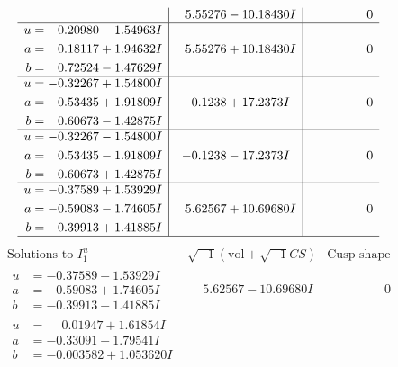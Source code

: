 \documentclass[1p]{elsarticle_modified}
\theoremstyle{definition}
\newcommand{\I}{\sqrt{-1}}
\begin{document}
$$\begin{array}{c|c|c}
 & \phantom{-}5.55276 - 10.18430 I & \phantom{-0.000000 } 0 \\ \hline\begin{aligned}
u &= \phantom{-}0.20980 - 1.54963 I \\
a &= \phantom{-}0.18117 + 1.94632 I \\
b &= \phantom{-}0.72524 - 1.47629 I\end{aligned}
 & \phantom{-}5.55276 + 10.18430 I & \phantom{-0.000000 } 0 \\ \hline\begin{aligned}
u &= -0.32267 + 1.54800 I \\
a &= \phantom{-}0.53435 + 1.91809 I \\
b &= \phantom{-}0.60673 - 1.42875 I\end{aligned}
 & -0.1238 + 17.2373 I & \phantom{-0.000000 } 0 \\ \hline\begin{aligned}
u &= -0.32267 - 1.54800 I \\
a &= \phantom{-}0.53435 - 1.91809 I \\
b &= \phantom{-}0.60673 + 1.42875 I\end{aligned}
 & -0.1238 - 17.2373 I & \phantom{-0.000000 } 0 \\ \hline\begin{aligned}
u &= -0.37589 + 1.53929 I \\
a &= -0.59083 - 1.74605 I \\
b &= -0.39913 + 1.41885 I\end{aligned}
 & \phantom{-}5.62567 + 10.69680 I & \phantom{-0.000000 } 0\\
 \hline 
 \end{array}$$\newpage$$\begin{array}{c|c|c}  
\text{Solutions to }I^u_{1}& \I (\text{vol} + \sqrt{-1}CS) & \text{Cusp shape}\\
 \hline 
\begin{aligned}
u &= -0.37589 - 1.53929 I \\
a &= -0.59083 + 1.74605 I \\
b &= -0.39913 - 1.41885 I\end{aligned}
 & \phantom{-}5.62567 - 10.69680 I & \phantom{-0.000000 } 0 \\ \hline\begin{aligned}
u &= \phantom{-}0.01947 + 1.61854 I \\
a &= -0.33091 - 1.79541 I \\
b &= -0.003582 + 1.053620 I\end{aligned}

\end{array}$$
\end{document}
